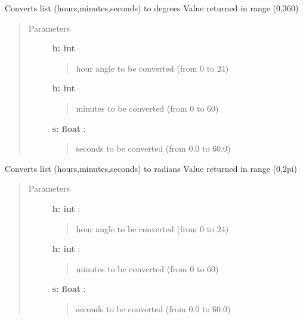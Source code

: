 \documentclass[letterpaper,10pt,english]{sphinxmanual}
\begin{document}
\begin{fulllineitems}
\label{index:astroCoords.rahms2deg}
Converts list (hours,minutes,seconds) to degrees
Value returned in range (0,360)
\begin{quote}\begin{description}
\item[{Parameters }] \leavevmode
\textbf{h: int} :
\begin{quote}

hour angle to be converted (from 0 to 24)
\end{quote}

\textbf{h: int} :
\begin{quote}

minutes to be converted (from 0 to 60)
\end{quote}

\textbf{s: float} :
\begin{quote}

seconds to be converted (from 0.0 to 60.0)
\end{quote}

\end{description}\end{quote}

\end{fulllineitems}



\begin{fulllineitems}
\label{index:astroCoords.rahms2rad}
Converts list (hours,minutes,seconds) to radians
Value returned in range (0,2pi)
\begin{quote}\begin{description}
\item[{Parameters }] \leavevmode
\textbf{h: int} :
\begin{quote}

hour angle to be converted (from 0 to 24)
\end{quote}

\textbf{h: int} :
\begin{quote}

minutes to be converted (from 0 to 60)
\end{quote}

\textbf{s: float} :
\begin{quote}

seconds to be converted (from 0.0 to 60.0)
\end{quote}

\end{description}\end{quote}

\end{fulllineitems}
\end{document}
